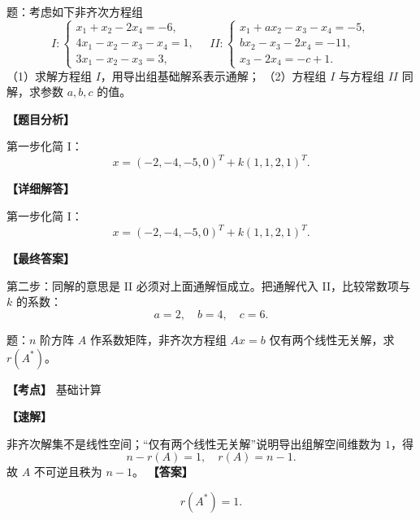 ﻿\documentclass[11pt,a4paper,UTF8]{ctexart}
\begin{document}
\begin{answerbox}
题：考虑如下非齐次方程组
\[
I:\begin{cases}
x_1+x_2-2x_4=-6,\\
4x_1-x_2-x_3-x_4=1,\\
3x_1-x_2-x_3=3,
\end{cases}
\quad
II:\begin{cases}
x_1+ax_2-x_3-x_4=-5,\\
bx_2-x_3-2x_4=-11,\\
x_3-2x_4=-c+1.
\end{cases}
\]
（1）求解方程组 $I$，用导出组基础解系表示通解；
（2）方程组 $I$ 与方程组 $II$ 同解，求参数 $a,b,c$ 的值。

\textbf{【题目分析】}

第一步化简 I：
\[
x=(-2,-4,-5,0)^T+k(1,1,2,1)^T.
\]

\textbf{【详细解答】}

第一步化简 I：
\[
x=(-2,-4,-5,0)^T+k(1,1,2,1)^T.
\]

\textbf{【最终答案】}

第二步：同解的意思是 II 必须对上面通解恒成立。把通解代入 II，比较常数项与 $k$ 的系数：
\[a=2,\quad b=4,\quad c=6.\]
\end{answerbox}
\begin{answerbox}[2022--2023 填空 4]
题：$n$ 阶方阵 $A$ 作系数矩阵，非齐次方程组 $Ax=b$ 仅有两个线性无关解，求 $r(A^*)$。

\textbf{【考点】} 基础计算

\textbf{【速解】}

非齐次解集不是线性空间；“仅有两个线性无关解”说明导出组解空间维数为 $1$，得
\[n-r(A)=1,\quad r(A)=n-1.\]
故 $A$ 不可逆且秩为 $n-1$。
\textbf{【答案】}

\[r(A^*)=1.\]
\end{answerbox}
\end{document}
